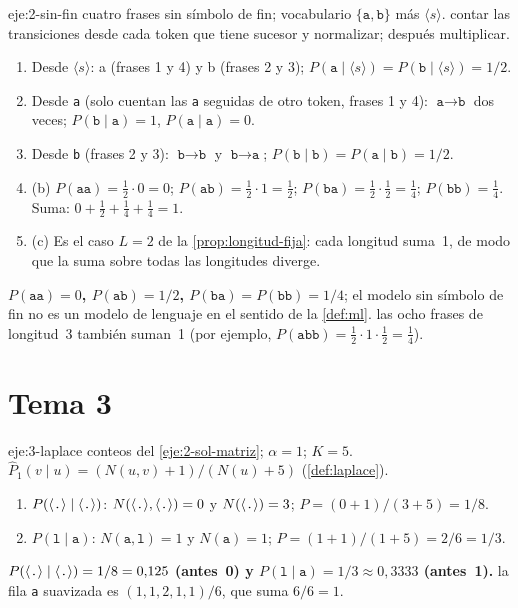 \begin{solucion}{eje:2-sin-fin}
\datos cuatro frases sin símbolo de fin; vocabulario $\{\texttt{a},\texttt{b}\}$ más $\langle s\rangle$.
\planteamiento contar las transiciones desde cada token que tiene sucesor y normalizar; después multiplicar.
\pasos
\begin{enumerate}[label=\arabic*.]
  \item Desde $\langle s\rangle$: a (frases 1 y 4) y b (frases 2 y 3); $P(\texttt{a}\mid\langle s\rangle)=P(\texttt{b}\mid\langle s\rangle)=1/2$.
  \item Desde \texttt{a} (solo cuentan las \texttt{a} seguidas de otro token, frases 1 y 4): $\texttt{a}\to\texttt{b}$ dos veces; $P(\texttt{b}\mid\texttt{a})=1$, $P(\texttt{a}\mid\texttt{a})=0$.
  \item Desde \texttt{b} (frases 2 y 3): $\texttt{b}\to\texttt{b}$ y $\texttt{b}\to\texttt{a}$; $P(\texttt{b}\mid\texttt{b})=P(\texttt{a}\mid\texttt{b})=1/2$.
  \item (b) $P(\texttt{aa})=\frac12\cdot 0=0$; $P(\texttt{ab})=\frac12\cdot 1=\frac12$; $P(\texttt{ba})=\frac12\cdot\frac12=\frac14$; $P(\texttt{bb})=\frac14$. Suma: $0+\frac12+\frac14+\frac14=1$.
  \item (c) Es el caso $L=2$ de la \cref{prop:longitud-fija}: cada longitud suma~1, de modo que la suma sobre todas las longitudes diverge.
\end{enumerate}
\resultado \textbf{$P(\texttt{aa})=0$, $P(\texttt{ab})=1/2$, $P(\texttt{ba})=P(\texttt{bb})=1/4$}; el modelo sin símbolo de fin no es un modelo de lenguaje en el sentido de la \cref{def:ml}.
\comprobacion las ocho frases de longitud~3 también suman~1 (por ejemplo, $P(\texttt{abb})=\frac12\cdot 1\cdot\frac12=\frac14$).
\end{solucion}

\section{Tema 3}

\begin{solucion}{eje:3-laplace}
\datos conteos del \cref{eje:2-sol-matriz}; $\alpha=1$; $K=5$.
\planteamiento $\widehat P_1(v\mid u)=(N(u,v)+1)/(N(u)+5)$ (\cref{def:laplace}).
\pasos
\begin{enumerate}[label=\arabic*.]
  \item $P(\langle\texttt{.}\rangle\mid\langle\texttt{.}\rangle)$: $N(\langle\texttt{.}\rangle,\langle\texttt{.}\rangle)=0$ y $N(\langle\texttt{.}\rangle)=3$; $P=(0+1)/(3+5)=1/8$.
  \item $P(\texttt{l}\mid\texttt{a})$: $N(\texttt{a},\texttt{l})=1$ y $N(\texttt{a})=1$; $P=(1+1)/(1+5)=2/6=1/3$.
\end{enumerate}
\resultado \textbf{$P(\langle\texttt{.}\rangle\mid\langle\texttt{.}\rangle)=1/8=0{,}125$ (antes~0) y $P(\texttt{l}\mid\texttt{a})=1/3\approx 0{,}3333$ (antes~1).}
\comprobacion la fila \texttt{a} suavizada es $(1,1,2,1,1)/6$, que suma $6/6=1$.
\end{solucion}

